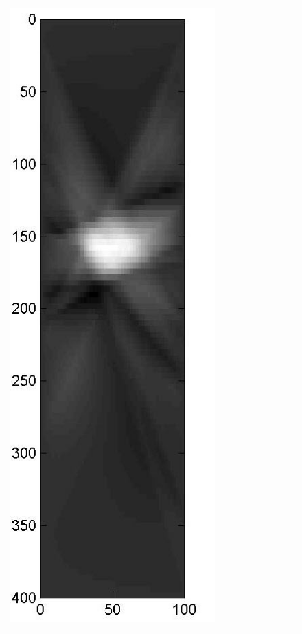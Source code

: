 \documentclass[11pt]{article}
\begin{document}
\begin{figure}[!h]
\begin{center}
\begin{tabular}{|c|c|c|c|c|c|c|c|c|}
			\includegraphics[width=.9\iwidth]{figures/newFigs/noisy/resultsExp-3-mk}
			&

\end{tabular}
\end{center}
\end{figure}
\end{document}
